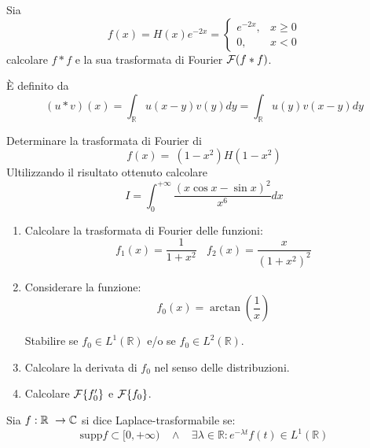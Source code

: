 Sia
\begin{equation*}
f( x) =H( x) e^{-2x} =\begin{cases}
e^{-2x} , & x\geqslant 0\\
0, & x< 0
\end{cases}
\end{equation*}
calcolare $\displaystyle f*f$ e la sua trasformata di Fourier $\displaystyle \mathcal{F} ( f*f)$.
\begin{rem}
 È definito da
\begin{equation*}
( u*v)( x) =\int _{\mathbb{R}} u( x-y) v( y) dy=\int _{\mathbb{R}} u( y) v( x-y) dy
\end{equation*}
\end{rem}
\Esercizio{}

Determinare la trasformata di Fourier di
\begin{equation*}
f( x) =\ \left( 1-x^{2}\right) H\left( 1-x^{2}\right)
\end{equation*}
Ultilizzando il risultato ottenuto calcolare
\begin{equation*}
I=\int ^{+\infty }_{0}\frac{( x\cos x-\sin x)^{2}}{x^{6}} dx
\end{equation*}
\Esercizio{}
\begin{enumerate}
\item Calcolare la trasformata di Fourier delle funzioni:\begin{equation*}
f_{1}( x) =\frac{1}{1+x^{2}} \ \ \ \ f_{2}( x) =\frac{x}{\left( 1+x^{2}\right)^{2}}
\end{equation*}
\item Considerare la funzione:\begin{equation*}
f_{0}( x) =\arctan\left(\frac{1}{x}\right)
\end{equation*}

Stabilire se $\displaystyle f_{0} \in L^{1}(\mathbb{R})$ e/o se $\displaystyle f_{0} \in L^{2}(\mathbb{R})$.
\item Calcolare la derivata di $\displaystyle f_{0}$ nel senso delle distribuzioni.
\item Calcolare $\mathcal{F} \{f'_{0}\}$ e $\mathcal{F} \{f_{0}\}$.
\end{enumerate}
\Esercizio{}
\begin{defn}
Sia $\displaystyle f:\mathbb{R} \ \rightarrow \CC $ si dice Laplace-trasformabile se:
\begin{equation*}
\mathrm{supp} f\subset [ 0,+\infty ) \ \ \ \ \land \ \ \ \ \exists \lambda \in \mathbb{R} :e^{-\lambda t} f( t) \in L^{1}(\mathbb{R})
\end{equation*}
\end{defn}
